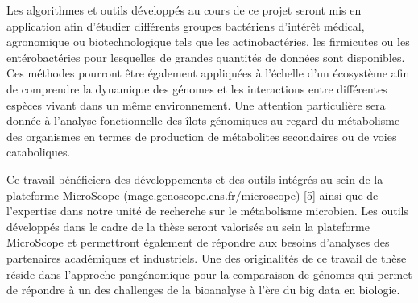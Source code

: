 \begin{mdframed}[linecolor=Prune,linewidth=1]
\begin{multicols}{2}
Les algorithmes et outils développés au cours de ce projet seront mis en application afin d’étudier différents groupes bactériens d'intérêt médical, agronomique ou biotechnologique tels que les actinobactéries, les firmicutes ou les entérobactéries pour lesquelles de grandes quantités de données sont disponibles. Ces méthodes pourront être également appliquées à l’échelle d’un écosystème afin de comprendre la dynamique des génomes et les interactions entre différentes espèces vivant dans un même environnement. Une attention particulière sera donnée à l’analyse fonctionnelle des îlots génomiques au regard du métabolisme des organismes en termes de production de métabolites secondaires ou de voies cataboliques.

Ce travail bénéficiera des développements et des outils intégrés au sein de la plateforme MicroScope (mage.genoscope.cns.fr/microscope) [5] ainsi que de l’expertise dans notre unité de recherche sur le métabolisme microbien. Les outils développés dans le cadre de la thèse seront valorisés au sein la plateforme MicroScope et permettront également de répondre aux besoins d’analyses des partenaires académiques et industriels. Une des originalités de ce travail de thèse réside dans l’approche pangénomique pour la comparaison de génomes qui permet de répondre à un des challenges de la bioanalyse à l’ère du big data en biologie. 
\end{multicols}

\end{mdframed}

\vspace{8mm}

